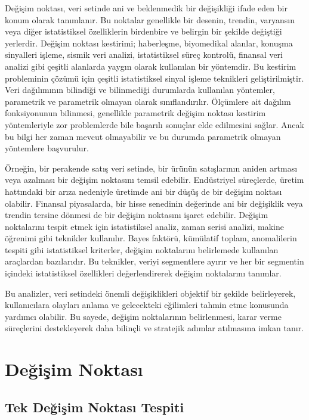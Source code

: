 \documentclass[12pt,twoside]{deuthesis}
\begin{document}
Değişim noktası, veri setinde ani ve beklenmedik bir değişikliği ifade eden bir konum olarak tanımlanır. Bu noktalar genellikle bir desenin, trendin, varyansın veya diğer istatistiksel özelliklerin birdenbire ve belirgin bir şekilde değiştiği yerlerdir. Değişim noktası kestirimi; haberleşme, biyomedikal alanlar, konuşma sinyalleri işleme, sismik veri analizi, istatistiksel süreç kontrolü, finansal veri analizi gibi çeşitli alanlarda yaygın olarak kullanılan bir yöntemdir. Bu kestirim probleminin çözümü için çeşitli istatistiksel sinyal işleme teknikleri geliştirilmiştir. Veri dağılımının bilindiği ve bilinmediği durumlarda kullanılan yöntemler, parametrik ve parametrik olmayan olarak sınıflandırılır. Ölçümlere ait dağılım fonksiyonunun bilinmesi, genellikle parametrik değişim noktası kestirim yöntemleriyle zor problemlerde bile başarılı sonuçlar elde edilmesini sağlar. Ancak bu bilgi her zaman mevcut olmayabilir ve bu durumda parametrik olmayan yöntemlere başvurulur.

Örneğin, bir perakende satış veri setinde, bir ürünün satışlarının aniden artması veya azalması bir değişim noktasını temsil edebilir. Endüstriyel süreçlerde, üretim hattındaki bir arıza nedeniyle üretimde ani bir düşüş de bir değişim noktası olabilir. Finansal piyasalarda, bir hisse senedinin değerinde ani bir değişiklik veya trendin tersine dönmesi de bir değişim noktasını işaret edebilir. Değişim noktalarını tespit etmek için istatistiksel analiz, zaman serisi analizi, makine öğrenimi gibi teknikler kullanılır. Bayes faktörü, kümülatif toplam, anomalilerin tespiti gibi istatistiksel kriterler, değişim noktalarını belirlemede kullanılan araçlardan bazılarıdır. Bu teknikler, veriyi segmentlere ayırır ve her bir segmentin içindeki istatistiksel özellikleri değerlendirerek değişim noktalarını tanımlar.

Bu analizler, veri setindeki önemli değişiklikleri objektif bir şekilde belirleyerek, kullanıcılara olayları anlama ve gelecekteki eğilimleri tahmin etme konusunda yardımcı olabilir. Bu sayede, değişim noktalarının belirlenmesi, karar verme süreçlerini destekleyerek daha bilinçli ve stratejik adımlar atılmasına imkan tanır.

\hypertarget{Bolum2}{%
\chapter{Değişim Noktası}\label{Bolum2}}

\hypertarget{tek-deux11fiux15fim-noktasux131-tespiti}{%
\section{Tek Değişim Noktası Tespiti}\label{tek-deux11fiux15fim-noktasux131-tespiti}}
\end{document}

